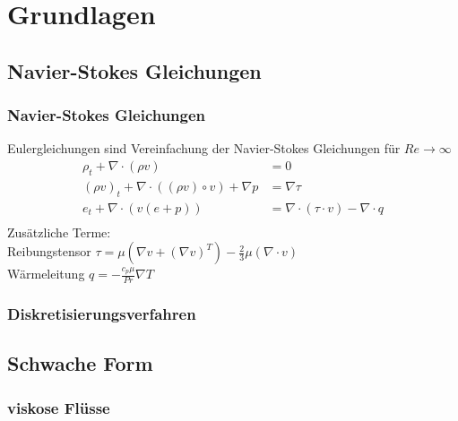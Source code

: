 \documentclass[
	11pt, %
	aspectratio=169, %
]{beamer}
\begin{document}
\section{Grundlagen} %

\subsection{Navier-Stokes Gleichungen}


\begin{frame}
	\frametitle{Navier-Stokes Gleichungen}
	Eulergleichungen sind Vereinfachung der Navier-Stokes Gleichungen für $Re \rightarrow \infty$\\
	\begin{equation}
	\begin{split}
		\rho_t + \nabla\cdot (\rho v) &= 0\\
		(\rho v)_t + \nabla\cdot ((\rho v)\circ v) + \nabla p &=\nabla \tau\\
		e_t + \nabla \cdot (v(e+p)) &=\nabla \cdot (\tau \cdot v) - \nabla \cdot q \\
	\end{split}
\end{equation}
	Zusätzliche Terme:\\
	Reibungstensor $\tau = \mu (\nabla v + (\nabla v)^T) - \frac{2}{3}\mu (\nabla \cdot v)$\\
	Wärmeleitung $q = -\frac{c_p\mu}{Pr}\nabla T$\\

\end{frame}


\begin{frame}
	\frametitle{Diskretisierungsverfahren}
	


\end{frame}

\subsection{Schwache Form}

\begin{frame}

	\frametitle{viskose Flüsse}

\end{frame}
\end{document}
